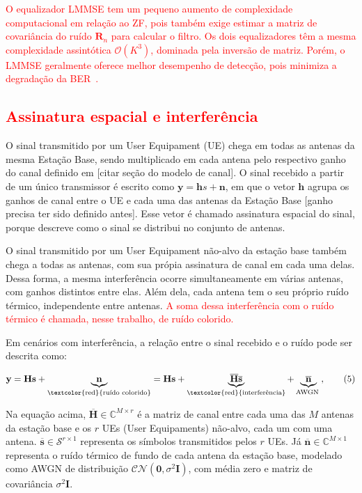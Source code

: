 \textcolor{red}{O equalizador LMMSE tem um pequeno aumento de complexidade computacional em relação ao ZF, pois também exige estimar a matriz de covariância do ruído $\mathbf{R}_n$ para calcular o filtro. Os dois equalizadores têm a mesma complexidade assintótica $\mathcal{O}(K^3)$, dominada pela inversão de matriz. Porém, o LMMSE geralmente oferece melhor desempenho de detecção, pois minimiza a degradação da BER~\cite{li-tradeofs}.}



 

\subsection{\texorpdfstring{\textcolor{red}{Assinatura espacial e interferência}}{Assinatura espacial e interferência}}

O sinal transmitido por um User Equipament (UE) chega em todas as antenas da mesma Estação Base, sendo multiplicado em cada antena pelo respectivo ganho do canal definido em [citar seção do modelo de canal]. O sinal recebido a partir de um único transmissor é escrito como $\mathbf{y}=\mathbf{h}s+\mathbf{n}$, em que o vetor $\mathbf{h}$ agrupa os ganhos de canal entre o UE e cada uma das antenas da Estação Base [ganho precisa ter sido definido antes]. Esse vetor é chamado assinatura espacial do sinal, porque descreve como o sinal se distribui no conjunto de antenas. 

O sinal transmitido por um User Equipament não-alvo da estação base também chega a todas as antenas, com sua própia assinatura de canal em cada uma delas. Dessa forma, a mesma interferência ocorre simultaneamente em várias antenas, com ganhos distintos entre elas. Além dela, cada antena tem o seu próprio ruído térmico, independente entre antenas. \textcolor{red}{A soma dessa interferência com o ruído térmico é chamada, nesse trabalho, de ruído colorido.}

Em cenários com interferência, a relação entre o sinal recebido e o ruído pode ser descrita como:

\begin{equation*}
\mathbf{y}=\mathbf{H s}+\underbrace{\mathbf{n}}_{\text{\textcolor{red}{ruído colorido}}}=\mathbf{H s}+\underbrace{\overline{\mathbf{H}} \overline{\mathbf{s}}}_{\text{\textcolor{red}{interferência}}}+\underbrace{\overline{\mathbf{n}}}_{\text {AWGN }}, \tag{5}
\end{equation*}

Na equação acima, $\overline{\mathbf{H}} \in \mathbb{C}^{M \times r}$ é a matriz de canal entre cada uma das $M$ antenas da estação base e os $r$ UEs (User Equipaments) não-alvo, cada um com uma antena. $\overline{\mathbf{s}} \in \mathcal{S}^{r \times 1}$ representa os símbolos transmitidos pelos $r$ UEs. Já $\overline{\mathbf{n}} \in \mathbb{C}^{M \times 1}$ representa o ruído térmico de fundo de cada antena da estação base, modelado como AWGN de distribuição $\mathcal{CN}(\mathbf{0}, \sigma^2\mathbf{I})$, com média zero e matriz de covariância $\sigma^2\mathbf{I}$.


